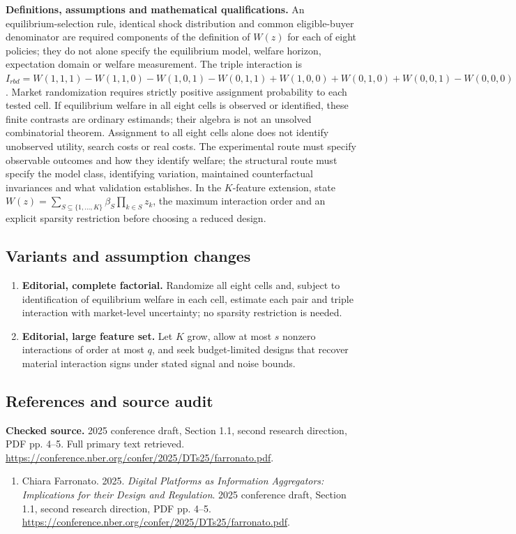\documentclass[11pt,a4paper]{article}
\begin{document}
\textbf{Definitions, assumptions and mathematical qualifications.} An equilibrium-selection rule, identical shock distribution and common eligible-buyer denominator are required components of the definition of \(W(z)\) for each of eight policies; they do not alone specify the equilibrium model, welfare horizon, expectation domain or welfare measurement. The triple interaction is \(I_{rbd}=W(1,1,1)-W(1,1,0)-W(1,0,1)-W(0,1,1)+W(1,0,0)+W(0,1,0)+W(0,0,1)-W(0,0,0)\). Market randomization requires strictly positive assignment probability to each tested cell. If equilibrium welfare in all eight cells is observed or identified, these finite contrasts are ordinary estimands; their algebra is not an unsolved combinatorial theorem. Assignment to all eight cells alone does not identify unobserved utility, search costs or real costs. The experimental route must specify observable outcomes and how they identify welfare; the structural route must specify the model class, identifying variation, maintained counterfactual invariances and what validation establishes. In the \(K\)-feature extension, state \(W(z)=\sum_{S\subseteq\{1,\ldots,K\}}\beta_S\prod_{k\in S}z_k\), the maximum interaction order and an explicit sparsity restriction before choosing a reduced design.
\subsection*{Variants and assumption changes}
\begin{enumerate}
\item \textbf{Editorial, complete factorial.} Randomize all eight cells and, subject to identification of equilibrium welfare in each cell, estimate each pair and triple interaction with market-level uncertainty; no sparsity restriction is needed.
\item \textbf{Editorial, large feature set.} Let \(K\) grow, allow at most \(s\) nonzero interactions of order at most \(q\), and seek budget-limited designs that recover material interaction signs under stated signal and noise bounds.
\end{enumerate}
\subsection*{References and source audit}
\textbf{Checked source.} 2025 conference draft, Section 1.1, second research direction, PDF pp. 4--5. Full primary text retrieved. \url{https://conference.nber.org/confer/2025/DTs25/farronato.pdf}.
\begin{enumerate}\raggedright
\item\hypertarget{definitions:source:30007683:1}{} Chiara Farronato. 2025. \emph{Digital Platforms as Information Aggregators: Implications for their Design and Regulation}. 2025 conference draft, Section 1.1, second research direction, PDF pp. 4--5.
\url{https://conference.nber.org/confer/2025/DTs25/farronato.pdf}.
\end{enumerate}
\end{document}

